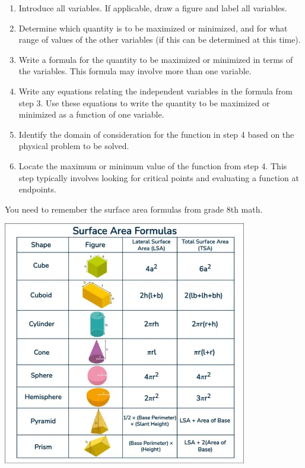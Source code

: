 \documentclass{article}
\begin{document}
\begin{enumerate}
    \item Introduce all variables. If applicable, draw a figure and label all variables.
    \item Determine which quantity is to be maximized or minimized, and for what range of values of the other variables (if this can be determined at this time).
    \item Write a formula for the quantity to be maximized or minimized in terms of the variables. This formula may involve more than one variable.
    \item Write any equations relating the independent variables in the formula from step 3. Use these equations to write the quantity to be maximized or minimized as a function of one variable.
    \item Identify the domain of consideration for the function in step 4 based on the physical problem to be solved.
    \item Locate the maximum or minimum value of the function from step 4. This step typically involves looking for critical points and evaluating a function at endpoints.
\end{enumerate}
You need to remember the surface area formulas from grade 8th math.
\begin{center}
\begin{minipage}{\linewidth}
    \centering
    \includegraphics[width=0.8\textwidth]{imgs/Surface-Area-Formulas.png}
\end{minipage}
\end{center}
\newpage
\end{document}
